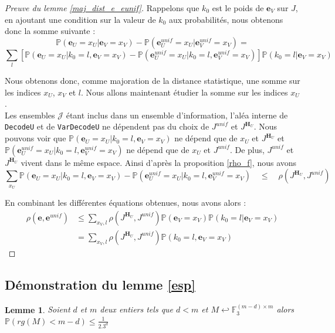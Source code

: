 \documentclass[12pt]{article}
\theoremstyle{plain}
\newtheorem{lemme}[thm]{Lemme}
\newcommand{\F}{\mathbb{F}}
\newcommand{\e}{\mathbf{e}}
\newcommand{\J}{\mathcal{J}}
\begin{document}
\begin{appendix}
\begin{proof}[Preuve du lemme \ref{maj_dist_e_eunif}]
\noindent Rappelons que $k_0$ est le poids de $\e_V$ sur $J$, en ajoutant une condition sur la valeur de $k_0$ aux probabilités, nous obtenons donc la somme suivante :
{\scriptsize
$$ \mathbb{P}(\e_U=x_U|\e_V=x_V) - \mathbb{P}(\e_U^{unif}=x_U | \e_V^{unif}=x_V) =  $$
$$ \sum\limits_l \left[ \mathbb{P}(\e_U=x_U|k_0 = l,\e_V=x_V) - \mathbb{P}(\e_U^{unif}=x_U |k_0 = l, \e_V^{unif}=x_V) \right] \mathbb{P}\left(k_0 = l | \e_V =x_V\right)$$
}

\noindent Nous obtenons donc, comme majoration de la distance statistique, une somme sur les indices $x_U$, $x_V$ et $l$. Nous allons maintenant étudier la somme sur les indices $x_U$.\\
\noindent Les ensembles $\J$ étant inclus dans un ensemble d'information, l'aléa interne de \verb|DecodeU| et de \verb|VarDecodeU| ne dépendent pas du choix de $J^{unif}$ et $J^{\mathbf{H}_U}$. 
Nous pouvons voir que $\mathbb{P}(\e_U=x_U|k_0 = l,\e_V=x_V)$ ne dépend que de $x_U$ et $J^{\mathbf{H}_U}$ et   $\mathbb{P}(\e_U^{unif}=x_U |k_0 = l, \e_V^{unif}=x_V)$ ne dépend que de $x_U$ et $J^{unif}$. 
De plus, $J^{unif}$ et $J^{\mathbf{H}_U}$ vivent dans le même espace.
Ainsi d'après la proposition \ref{rho_f}, nous avons 
{\scriptsize
$$ \sum\limits_{x_U}\mathbb{P}(\e_U=x_U|k_0 = l,\e_V=x_V) - \mathbb{P}(\e_U^{unif}=x_U |k_0 = l, \e_V^{unif}=x_V)\quad \leq\quad \rho(J^{\mathbf{H}_U},J^{unif})$$
}

En combinant les différentes équations obtenues, nous avons alors :
\begin{equation*}
\begin{split}
\rho\left(\e ,\e^{unif}\right) &\leq \sum\limits_{x_V,l} \rho\left(J^{\mathbf{H}_U},J^{unif}\right)\mathbb{P}(\e_V = x_V)\mathbb{P}\left(k_0 = l| \e_V = x_V\right)\\
&=\sum\limits_{x_V,l} \rho\left(J^{\mathbf{H}_U},J^{unif}\right)\mathbb{P}\left(k_0 = l, \e_V = x_V\right)
\end{split}
\end{equation*}
\end{proof}

\subsection*{Démonstration du lemme \ref{esp}}

\begin{lemme}\label{proba_rang}
Soient $d$ et $m$ deux entiers tels que $d<m$ et $M \hookleftarrow\F_3^{(m-d)\times m}$ alors $\mathbb{P}(rg(M) < m-d) \leq \frac{1}{2 . 3^d}$
\end{lemme}


\end{appendix}
\end{document}
